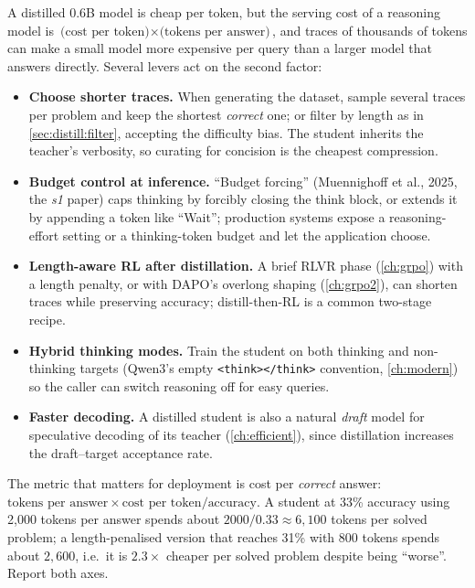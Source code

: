A distilled 0.6B model is cheap per token, but the serving cost of a reasoning model is
$\text{(cost per token)} \times \text{(tokens per answer)}$, and traces of thousands of tokens can
make a small model more expensive per query than a larger model that answers directly. Several
levers act on the second factor:
\begin{itemize}
\item \textbf{Choose shorter traces.} When generating the dataset, sample several traces per
problem and keep the shortest \emph{correct} one; or filter by length as in
\cref{sec:distill:filter}, accepting the difficulty bias. The student inherits the teacher's
verbosity, so curating for concision is the cheapest compression.
\item \textbf{Budget control at inference.} ``Budget forcing'' (Muennighoff et al., 2025, the
\emph{s1} paper) caps thinking by forcibly closing the think block, or extends it by appending a
token like ``Wait''; production systems expose a reasoning-effort setting or a thinking-token
budget and let the application choose.
\item \textbf{Length-aware RL after distillation.} A brief RLVR phase (\cref{ch:grpo}) with a
length penalty, or with DAPO's overlong shaping (\cref{ch:grpo2}), can shorten traces while
preserving accuracy; distill-then-RL is a common two-stage recipe.
\item \textbf{Hybrid thinking modes.} Train the student on both thinking and non-thinking
targets (Qwen3's empty \texttt{<think></think>} convention, \cref{ch:modern}) so the caller can
switch reasoning off for easy queries.
\item \textbf{Faster decoding.} A distilled student is also a natural \emph{draft} model for
speculative decoding of its teacher (\cref{ch:efficient}), since distillation increases the
draft--target acceptance rate.
\end{itemize}

\begin{systemslens}
The metric that matters for deployment is cost per \emph{correct} answer:
$\text{tokens per answer}\times\text{cost per token}/\text{accuracy}$. A student at 33\% accuracy
using 2{,}000 tokens per answer spends about $2000/0.33\approx 6{,}100$ tokens per solved problem;
a length-penalised version that reaches 31\% with 800 tokens spends about $2{,}600$, i.e.\ it is
$2.3\times$ cheaper per solved problem despite being ``worse''. Report both axes.
\end{systemslens}

